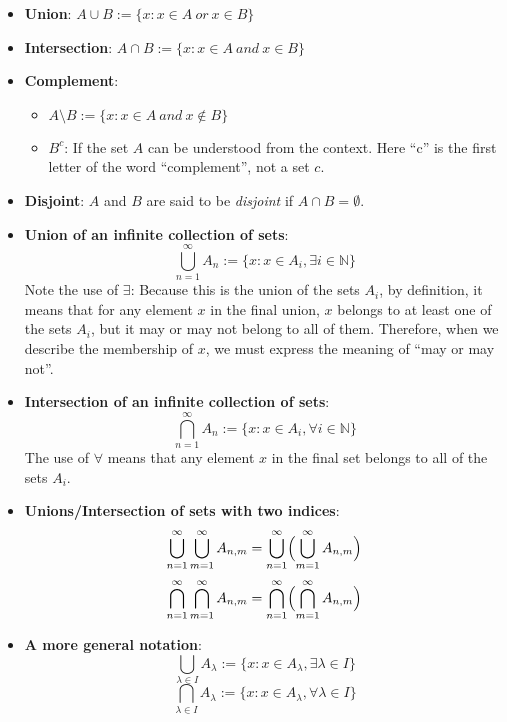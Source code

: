 \documentclass[12pt, letterpaper, oneside]{book}
\begin{document}
\begin{itemize}
  \item \textbf{Union}: $A \cup B := \{x: x \in A \ or \ x \in B\}$
  \item \textbf{Intersection}: $A \cap B := \{x: x \in A \ and \ x \in B\}$
  \item \textbf{Complement}:
        \begin{itemize}
          \item $A \setminus B := \{x: x \in A \ and \ x \notin B\}$
          \item $B^c$: If the set $A$ can be understood from the context. Here ``c''
                is the first letter of the word ``complement'', not a set $c$.
        \end{itemize}
  \item \textbf{Disjoint}: $A$ and $B$ are said to be \textit{disjoint} if $A
          \cap B = \emptyset$.
  \item \textbf{Union of an infinite collection of sets}:
        \[
          \bigcup_{n=1}^{\infty} A_n := \{x: x \in A_i, \exists i \in \mathbb{N}\}
        \]
        Note the use of $\exists$: Because this is the union of the sets $A_i$,
        by definition, it means that for any element $x$ in the final union, $x$
        belongs to at least one of the sets $A_i$, but it may or may not belong to
        all of them. Therefore, when we describe the membership of $x$, we must
        express the meaning of ``may or may not''.
  \item \textbf{Intersection of an infinite collection of sets}:
        \[
          \bigcap_{n=1}^{\infty} A_n := \{x: x \in A_i, \forall i \in \mathbb{N}\}
        \]
        The use of $\forall$ means that any element $x$ in the final set belongs
        to all of the sets $A_i$.
  \item \textbf{Unions/Intersection of sets with two indices}:
        \[
          \bigcup_{n=1}^{\infty} \bigcup_{m=1}^{\infty} A_{n,m} =
          \bigcup_{n=1}^{\infty} \Bigl(\bigcup_{m=1}^{\infty} A_{n,m}\Bigr)
        \]
        \[
          \bigcap_{n=1}^{\infty} \bigcap_{m=1}^{\infty} A_{n,m} =
          \bigcap_{n=1}^{\infty} \Bigl(\bigcap_{m=1}^{\infty} A_{n,m}\Bigr)
        \]
  \item \textbf{A more general notation}:
        \[
          \bigcup_{\lambda \in I} A_{\lambda} :=
          \{x: x \in A_{\lambda}, \exists \lambda \in I\}
        \]
        \[
          \bigcap_{\lambda \in I} A_{\lambda} :=
          \{x: x \in A_{\lambda}, \forall \lambda \in I\}
        \]
\end{itemize}
\end{document}
